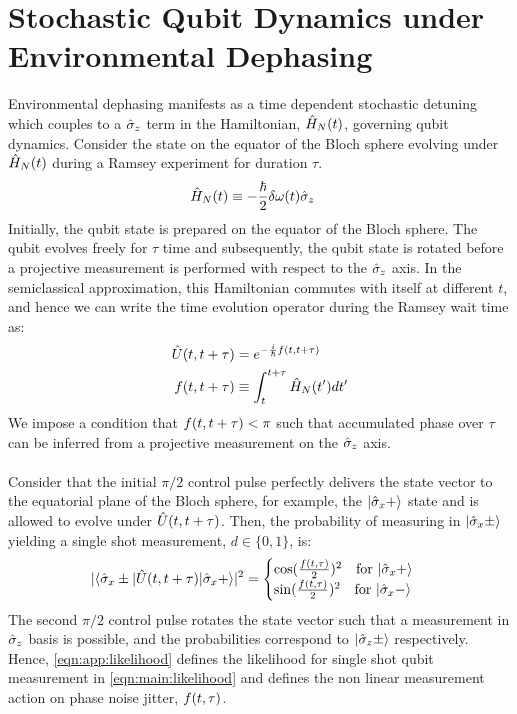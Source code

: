 \section{Stochastic Qubit Dynamics under Environmental Dephasing \label{sec:app:setup}}

Environmental dephasing manifests as a time dependent stochastic detuning which couples to a $\hat{\sigma}_{z}$ term in the Hamiltonian, $\hat{H}_{N} (t)$, governing qubit dynamics. Consider the state on the equator of the Bloch sphere evolving under $\hat{H}_{N} (t)$ during a Ramsey experiment for duration $\tau$. 
\begin{align}
\hat{H}_{N}(t) & \equiv -\frac{\hbar}{2}\delta\omega(t)\hat{\sigma}_{z}
\end{align}
Initially, the qubit state is prepared on the equator of the Bloch sphere. The qubit evolves freely for $\tau$ time and subsequently, the qubit state is rotated before a projective measurement is performed with respect to the $\hat{\sigma}_{z}$ axis. In the semiclassical approximation, this Hamiltonian commutes with itself at different $t$, and hence we can write the time evolution operator during the Ramsey wait time as:
\begin{align}
\hat{U}(t, t + \tau) & = e^{-\frac{i}{\hbar} f(t, t + \tau)} \\
f(t, t + \tau) & \equiv \int_{t}^{t + \tau} \hat{H}_{N} (t') dt' \label{eqn:app:phases}
\end{align}
We impose a condition that $f(t, t + \tau) < \pi$ such that accumulated phase over $\tau$ can be inferred from a projective measurement on the $\hat{\sigma}_{z}$ axis. 
\\
\\
Consider that the initial $\pi/2$ control pulse perfectly delivers the state vector to the equatorial plane of the Bloch sphere, for example, the  $| \hat{\sigma}_{x} + \rangle$ state and is allowed to evolve under $\hat{U}(t, t + \tau)$. Then, the probability of measuring in $| \hat{\sigma}_{x} \pm \rangle$ yielding a single shot measurement, $d \in \{0, 1\}$, is:
\begin{align} 
|\langle \hat{\sigma}_{x} \pm | \hat{U}(t, t + \tau) | \hat{\sigma}_{x} + \rangle|^2= \begin{cases} \cos(\frac{f(t, \tau)}{2})^2 \quad \text{for $ | \hat{\sigma}_{x} + \rangle$} \\   \sin(\frac{f(t, \tau)}{2})^2  \quad \text{for $ | \hat{\sigma}_{x} - \rangle$} \end{cases} \label{eqn:app:likelihood}
\end{align}
The second $\pi/2$ control pulse rotates the state vector such that a measurement in $\hat{\sigma}_{z}$ basis is possible, and the probabilities correspond to $| \hat{\sigma}_{z} \pm \rangle$
respectively. Hence, \cref{eqn:app:likelihood} defines the likelihood for single shot qubit measurement in \cref{eqn:main:likelihood} and defines the non linear measurement action on phase noise jitter, $f(t, \tau)$.

